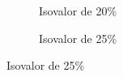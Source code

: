 \begin{figure}[h]
\begin{subfigure}[b]{0.30\textwidth}
{		}
		\caption{Isovalor de 20\%}
	\end{subfigure}
	\quad
	\begin{subfigure}[b]{0.30\textwidth}
		\centering
		\caption{Isovalor de 25\%}
	\end{subfigure}



\end{figure}
